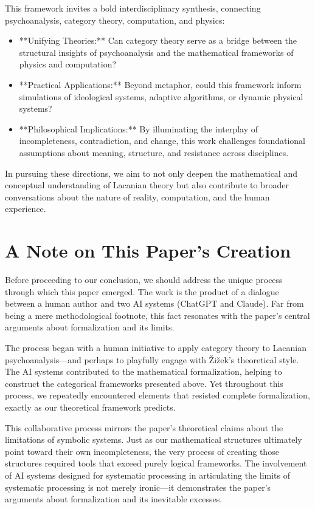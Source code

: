\documentclass{article}
\begin{document}
This framework invites a bold interdisciplinary synthesis, connecting psychoanalysis, category theory, computation, and physics:
\begin{itemize}
    \item **Unifying Theories:** Can category theory serve as a bridge between the structural insights of psychoanalysis and the mathematical frameworks of physics and computation?
    \item **Practical Applications:** Beyond metaphor, could this framework inform simulations of ideological systems, adaptive algorithms, or dynamic physical systems?
    \item **Philosophical Implications:** By illuminating the interplay of incompleteness, contradiction, and change, this work challenges foundational assumptions about meaning, structure, and resistance across disciplines.
\end{itemize}

In pursuing these directions, we aim to not only deepen the mathematical and conceptual understanding of Lacanian theory but also contribute to broader conversations about the nature of reality, computation, and the human experience.

\section{A Note on This Paper's Creation}

Before proceeding to our conclusion, we should address the unique process through which this paper emerged. The work is the product of a dialogue between a human author and two AI systems (ChatGPT and Claude). Far from being a mere methodological footnote, this fact resonates with the paper's central arguments about formalization and its limits.

The process began with a human initiative to apply category theory to Lacanian psychoanalysis---and perhaps to playfully engage with \v{Z}i\v{z}ek's theoretical style. The AI systems contributed to the mathematical formalization, helping to construct the categorical frameworks presented above. Yet throughout this process, we repeatedly encountered elements that resisted complete formalization, exactly as our theoretical framework predicts.

This collaborative process mirrors the paper's theoretical claims about the limitations of symbolic systems. Just as our mathematical structures ultimately point toward their own incompleteness, the very process of creating those structures required tools that exceed purely logical frameworks. The involvement of AI systems designed for systematic processing in articulating the limits of systematic processing is not merely ironic---it demonstrates the paper's arguments about formalization and its inevitable excesses.
\end{document}
